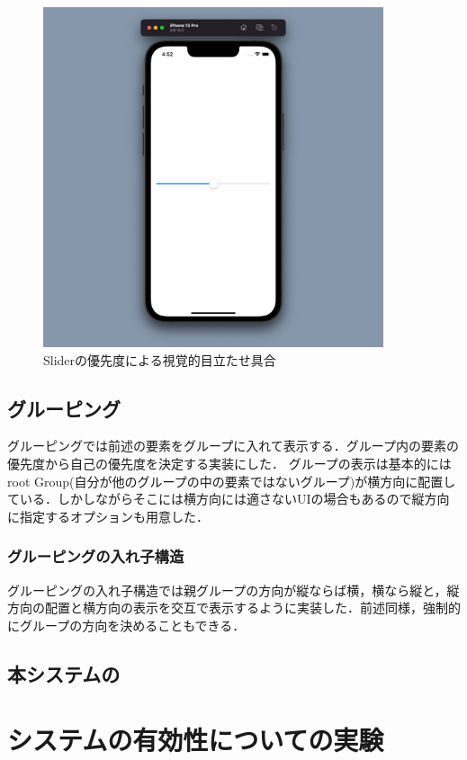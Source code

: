 \begin{figure}[htbp]
  \begin{minipage}{\hsize}
    \begin{center}
       \includegraphics[width=100mm]{img/Slider_priority.png}
    \end{center}
    \caption{Sliderの優先度による視覚的目立たせ具合}
    \label{fig:slider_priority}
  \end{minipage}
\end{figure}


\subsection{グルーピング}
グルーピングでは前述の要素をグループに入れて表示する．グループ内の要素の優先度から自己の優先度を決定する実装にした．
グループの表示は基本的にはroot Group(自分が他のグループの中の要素ではないグループ)が横方向に配置している．しかしながらそこには横方向には適さないUIの場合もあるので縦方向に指定するオプションも用意した．
\subsubsection{グルーピングの入れ子構造}
グルーピングの入れ子構造では親グループの方向が縦ならば横，横なら縦と，縦方向の配置と横方向の表示を交互で表示するように実装した．前述同様，強制的にグループの方向を決めることもできる．
\subsection{本システムの}

\section{システムの有効性についての実験}

